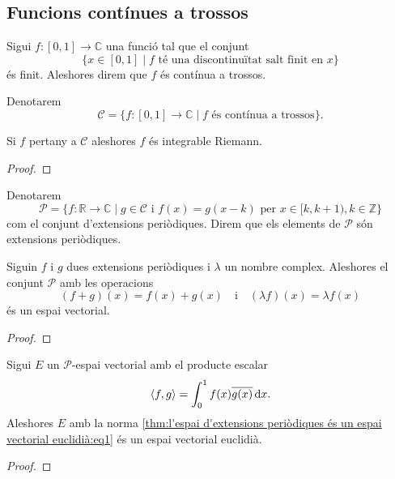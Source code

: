 \documentclass[../../Main.tex]{subfiles}
\begin{document}
	\subsection{Funcions contínues a trossos}
	\begin{definition}
		\label{def:funció contínua a trossos}
		Sigui \(f\colon[0,1]\longrightarrow\mathbb{C}\) una funció tal que el conjunt
		\[\{x\in[0,1]\mid f\text{ té una discontinuïtat salt finit en }x\}\]
		és finit. Aleshores direm que \(f\) és contínua a trossos.
		
		Denotarem
		\[\mathcal{C}=\{f\colon[0,1]\longrightarrow\mathbb{C}\mid f\text{ és contínua a trossos}\}.\]
	\end{definition}
	\begin{observation}
		\label{obs:les funcions contínues a trossos són integrables}
		Si \(f\) pertany a \(\mathcal{C}\) aleshores \(f\) és integrable Riemann.
		\begin{proof}
		\end{proof}
	\end{observation}
	\begin{definition}
		\label{def:conjunt d'extensions periòdiques}
		Denotarem
		\label{def:extensió periòdica}
		\[\mathcal{P}=\{f\colon\mathbb{R}\longrightarrow\mathbb{C}\mid g\in\mathcal{C}\text{ i }f(x)=g(x-k)\text{ per }x\in[k,k+1),k\in\mathbb{Z}\}\]
		com el conjunt d'extensions periòdiques. Direm que els elements de \(\mathcal{P}\) són extensions periòdiques.
	\end{definition}
	\begin{lemma}
		\label{lema:l'espai d'extensions periòdiques és un espai vectorial}
		Siguin \(f\) i \(g\) dues extensions periòdiques i \(\lambda\) un nombre complex. Aleshores el conjunt \(\mathcal{P}\) amb les operacions
		\[(f+g)(x)=f(x)+g(x)\quad\text{i}\quad(\lambda f)(x)=\lambda f(x)\]
		és un espai vectorial.
		\begin{proof}
		\end{proof}
	\end{lemma}
	\begin{theorem}
		\label{thm:l'espai d'extensions periòdiques és un espai vectorial euclidià}
		Sigui \(E\) un \(\mathcal{P}\)-espai vectorial amb el producte escalar
		\begin{equation}
			\label{thm:l'espai d'extensions periòdiques és un espai vectorial euclidià:eq1}
			\langle f,g\rangle=\int_{0}^{1}f(x)\overline{g(x)}\mathop{}\!\mathrm{d} x.
		\end{equation}
		Aleshores \(E\) amb la norma \eqref{thm:l'espai d'extensions periòdiques és un espai vectorial euclidià:eq1} és un espai vectorial euclidià.
		\begin{proof}
		\end{proof}
	\end{theorem}
\end{document}
